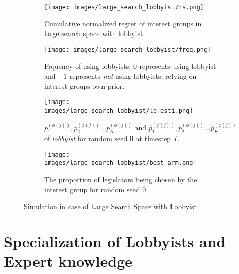 \documentclass{article}
\begin{document}
\begin{figure}[h!]
    \centering %
    \begin{subfigure}[b]{0.45\textwidth}
        
        \texttt{[image: images/large\_search\_lobbyist/rs.png]}
        
        \caption{Cumulative normalized regret of interest groups in large search space with lobbyist}
        \label{fig:rs_lb}

    \end{subfigure}
    \hfill
    \begin{subfigure}[b]{0.45\textwidth}
        \texttt{[image: images/large\_search\_lobbyist/freq.png]}
        \caption{Frquency of using lobbyists. $0$ represents using lobbyist and $-1$ represents 
        \textit{not} using lobbyists, relying on interest groups own prior.
        }
        \label{fig:lbproba}
    \end{subfigure}

    \begin{subfigure}[b]{0.45\textwidth}
        
        \texttt{[image: images/large\_search\_lobbyist/lb\_esti.png]}
        
        \caption{$p_1^{(\phi(j))}, p_2^{(\phi(j))} \hdots p_K^{(\phi(j))} \text{ and } \hat{p}_1^{(\phi(j))}, \hat{p}_2^{(\phi(j))} \hdots \hat{p}_K^{(\phi(j))}$ of \textit{lobbyist} for random seed $0$ at timestep $T$.}
        \label{fig:esti_lb}

    \end{subfigure}
    \hfill
    \begin{subfigure}[b]{0.45\textwidth}
        \texttt{[image: images/large\_search\_lobbyist/best\_arm.png]}
        \caption{The proportion of legislators being chosen by the interest group for random seed $0$.}
        \label{fig:lbpropo}
    \end{subfigure}

    \caption{Simulation in case of Large Search Space with Lobbyist}
\end{figure}

\section{Specialization of Lobbyists and Expert knowledge}
\end{document}
